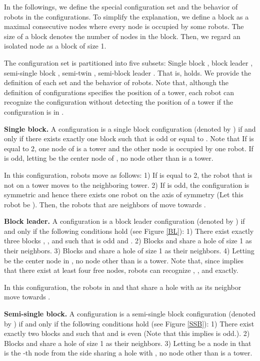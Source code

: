 \documentclass[11pt]{article}
\begin{document}
In the followings, we define the special configuration set  and the behavior of robots in the configurations. To simplify the explanation, we define a block as a maximal consecutive nodes where every node is occupied by some robots. The size  of a block  denotes the number of nodes in the block. Then, we regard an isolated node as a block of size 1. 

The configuration set  is partitioned into five subsets: Single block , block leader , semi-single block , semi-twin , semi-block leader . That is,  holds. We provide the definition of each set and the behavior of robots. Note that, although the definition of configurations specifies the position of a tower, each robot can recognize the configuration without detecting the position of a tower if the configuration is in .
\begin{itemize*}
\item {\bf Single block.} A configuration  is a single block configuration (denoted by ) if and only if there exists exactly one block  such that  is odd or equal to . Note that If  is equal to 2, one node of  is a tower and the other node is occupied by one robot. If  is odd, letting  be the center node of , no node other than  is a tower.



In this configuration, robots move as follows: 1) If  is equal to 2, the robot that is not on a tower moves to the neighboring tower. 2) If  is odd, the configuration is symmetric and hence there exists one robot on the axis of symmetry (Let this robot be ). Then, the robots that are neighbors of  move towards .

\item {\bf Block leader.} A configuration  is a block leader configuration (denoted by ) if and only if the following conditions hold (see Figure \ref{BL}): 1) There exist exactly three blocks , , and  such that  is odd and . 2) Blocks  and  share a hole of size 1 as their neighbors. 3) Blocks  and  share a hole of size 1 as their neighbors. 4) Letting  be the center node in , no node other than  is a tower. Note that, since  implies that there exist at least four free nodes, robots can recognize , , and  exactly.

In this configuration, the robots in  and  that share a hole with  as its neighbor move towards .

\item {\bf Semi-single block.} A configuration  is a semi-single block configuration (denoted by ) if and only if the following conditions hold (see Figure \ref{SSB}): 1) There exist exactly two blocks  and  such that  and  is even (Note that this implies  is odd.). 2) Blocks  and  share a hole of size 1 as their neighbors. 3) Letting  be a node in  that is the -th node from the side sharing a hole with , no node other than  is a tower.


\end{itemize*}
\end{document}
